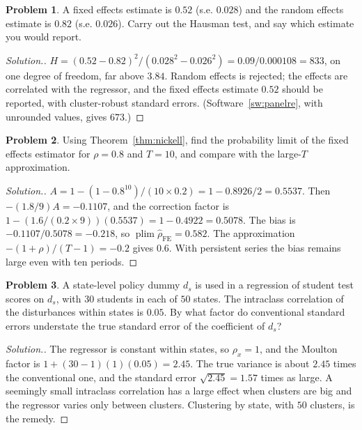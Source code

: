 \documentclass[11pt,a4paper]{article}
\numberwithin{equation}{section}
\DeclareMathOperator{\plim}{plim}
\theoremstyle{definition}
\newtheorem{problemx}{Problem}[subsection]
\newenvironment{problem}{\begin{problemx}}{\end{problemx}}
\newenvironment{solution}
  {\renewcommand{\qedsymbol}{}\begin{proof}[\textit{Solution}.]}
  {\end{proof}}
\begin{document}
\begin{problem}
A fixed effects estimate is $0.52$ (s.e. $0.028$) and the random effects estimate is $0.82$ (s.e. $0.026$). Carry out the Hausman test, and say which estimate you
would report.
\end{problem}

\begin{solution}
$H = (0.52 - 0.82)^2/(0.028^2 - 0.026^2) = 0.09/0.000108 = 833$, on one degree of freedom, far above $3.84$. Random effects is rejected; the effects are correlated with the
regressor, and the fixed effects estimate $0.52$ should be reported, with cluster-robust standard errors. (Software~\ref{sw:panelre}, with unrounded values, gives $673$.)
\end{solution}

\begin{problem}
Using Theorem~\ref{thm:nickell}, find the probability limit of the fixed effects estimator for $\rho = 0.8$ and $T = 10$, and compare with the large-$T$ approximation.
\end{problem}

\begin{solution}
$A = 1 - (1 - 0.8^{10})/(10 \times 0.2) = 1 - 0.8926/2 = 0.5537$. Then $-(1.8/9)A = -0.1107$, and the correction factor is $1 - (1.6/(0.2 \times 9))(0.5537) = 1 - 0.4922 = 0.5078$. The
bias is $-0.1107/0.5078 = -0.218$, so $\plim\hat\rho_{\text{FE}} = 0.582$. The approximation $-(1 + \rho)/(T - 1) = -0.2$ gives $0.6$. With persistent series the bias remains large even with ten
periods.
\end{solution}

\begin{problem}
A state-level policy dummy $d_s$ is used in a regression of student test scores on $d_s$, with $30$ students in each of $50$ states. The intraclass correlation of the
disturbances within states is $0.05$. By what factor do conventional standard errors understate the true standard error of the coefficient of $d_s$?
\end{problem}

\begin{solution}
The regressor is constant within states, so $\rho_x = 1$, and the Moulton factor is $1 + (30 - 1)(1)(0.05) = 2.45$. The true variance is about $2.45$ times the conventional one,
and the standard error $\sqrt{2.45} = 1.57$ times as large. A seemingly small intraclass correlation has a large effect when clusters are big and the regressor varies
only between clusters. Clustering by state, with $50$ clusters, is the remedy.
\end{solution}
\end{document}
